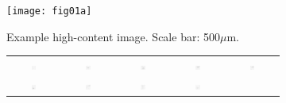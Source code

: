 \begin{figure}
	\centering
	\begin{subfigure}{\textwidth}
		\centering
		\texttt{[image: fig01a]}
		\vspace{-0.5em}
		\caption{Example high-content image. Scale bar: 500$\mu$m.}
		\vspace{1em}
	\end{subfigure}
	\begin{subfigure}{\textwidth}
		\centering
		\begin{tabular}{c@{\,}c@{\,}c@{\,}c@{\,}c@{}}
			\includegraphics[width=0.1\textwidth]{fig01b01} &
			\includegraphics[width=0.1\textwidth]{fig01b02} &
			\includegraphics[width=0.1\textwidth]{fig01b03} &
			\includegraphics[width=0.1\textwidth]{fig01b04} &
			\includegraphics[width=0.1\textwidth]{fig01b05} \\
			\includegraphics[width=0.1\textwidth]{fig01b06} &
			\includegraphics[width=0.1\textwidth]{fig01b07} &
			\includegraphics[width=0.1\textwidth]{fig01b08} &
			\includegraphics[width=0.1\textwidth]{fig01b09} &

\end{tabular}
\end{subfigure}
\end{figure}
